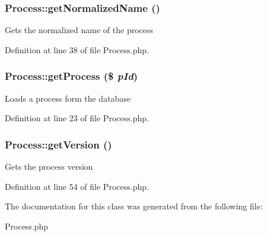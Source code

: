 \subsubsection{\setlength{\rightskip}{0pt plus 5cm}Process::get\-Normalized\-Name ()}\label{classProcess_a2}


Gets the normalized name of the process

Definition at line 38 of file Process.php.
\subsubsection{\setlength{\rightskip}{0pt plus 5cm}Process::get\-Process (\$ {\em p\-Id})}\label{classProcess_a1}


Loads a process form the database

Definition at line 23 of file Process.php.
\subsubsection{\setlength{\rightskip}{0pt plus 5cm}Process::get\-Version ()}\label{classProcess_a4}


Gets the process version

Definition at line 54 of file Process.php.

The documentation for this class was generated from the following file:\begin{CompactItemize}
\item 
Process.php\end{CompactItemize}
